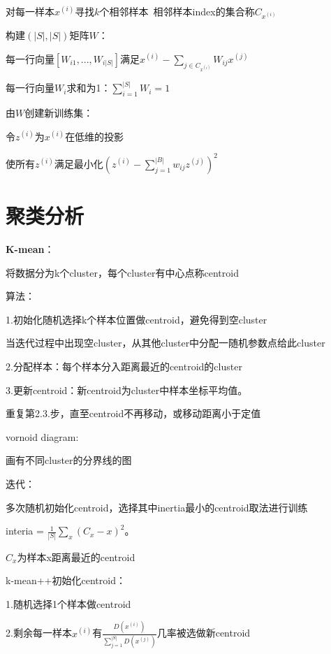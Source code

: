 \documentclass[UTF8]{ctexart}
\begin{document}
  对每一样本$x^{(i)}$寻找$k$个相邻样本\ 相邻样本index的集合称$C_{x^{(i)}}$
  
  构建$(|S|, |S|)$矩阵$W$：
  
  \quad 每一行向量$[W_{i1}, ..., W_{i|S|}]$满足$x^{(i)} - \sum_{j \in C_{x^{(i)}}} W_{ij}x^{(j)}$
  
  \quad 每一行向量$W_i$求和为1：$\sum_{i=1}^{|S|}W_i = 1$

  由$W$创建新训练集：

  \quad 令$z^{(i)}$为$x^{(i)}$在低维的投影

  \quad 使所有$z^{(i)}$满足最小化$(z^{(i)} - \sum_{j=1}^{|B|}w_{ij}z^{(j)})^2$

\section{聚类分析}
\noindent \textbf{K-mean}：

  将数据分为k个cluster，每个cluster有中心点称centroid
  
  算法：
  
  \quad 1.初始化随机选择k个样本位置做centroid，避免得到空cluster

  \quad \quad 当迭代过程中出现空cluster，从其他cluster中分配一随机参数点给此cluster

  \quad 2.分配样本：每个样本分入距离最近的centroid的cluster

  \quad 3.更新centroid：新centroid为cluster中样本坐标平均值。
  
  \quad 重复第2.3.步，直至centroid不再移动，或移动距离小于定值

  vornoid diagram:

  \quad 画有不同cluster的分界线的图

  迭代：
  
  \quad 多次随机初始化centroid，选择其中inertia最小的centroid取法进行训练

  \quad \quad interia = $\frac{1}{|S|}\sum_x (C_x - x)^2$。

  \quad \quad \quad $C_x$为样本x距离最近的centroid

  \quad k-mean++初始化centroid：

  \quad \quad 1.随机选择1个样本做centroid

  \quad \quad 2.剩余每一样本$x^{(i)}$有$\frac{D(x^{(i)})}{\sum_{j=1}^{|S|} D(x^{(j)})}$几率被选做新centroid
\end{document}
